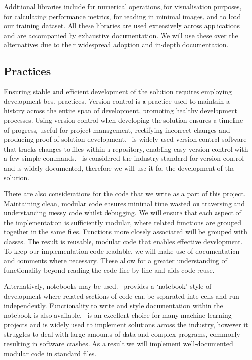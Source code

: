 Additional  libraries include  for numerical operations,  for visualisation purposes,  for calculating performance metrics,  for reading in minimal images, and  to load our training dataset. All these libraries are used extensively across  applications and are accompanied by exhaustive documentation. We will use these over the alternatives due to their widespread adoption and in-depth documentation.

\subsection{Practices}
Ensuring stable and efficient development of the solution requires employing development best practices. Version control is a practice used to maintain a history across the entire span of development, promoting healthy development processes. Using version control when developing the solution ensures a timeline of progress, useful for project management, rectifying incorrect changes and producing proof of solution development.\  is widely used version control software that tracks changes to files within a repository, enabling easy version control with a few simple commands.\  is considered the industry standard for version control and is widely documented, therefore we will use it for the development of the solution.

There are also considerations for the code that we write as a part of this project. Maintaining clean, modular code ensures minimal time wasted on traversing and understanding messy code whilst debugging. We will ensure that each aspect of the implementation is sufficiently modular, where related functions are grouped together in the same  files. Functions more closely associated will be grouped with  classes. The result is reusable, modular code that enables effective development. To keep our implementation code readable, we will make use of documentation and comments where necessary. These allow for a greater understanding of functionality beyond reading the code line-by-line and aids code reuse. 

Alternatively,  notebooks may be used.\  provides a `notebook' style of development where related sections of code can be separated into cells and run independently. Functionality to write and style documentation within the notebook is also available.\  is an excellent choice for many machine learning projects and is widely used to implement solutions across the industry, however it struggles to deal with large amounts of data and complex programs, commonly resulting in software crashes. As a result we will implement well-documented, modular code in standard  files.

